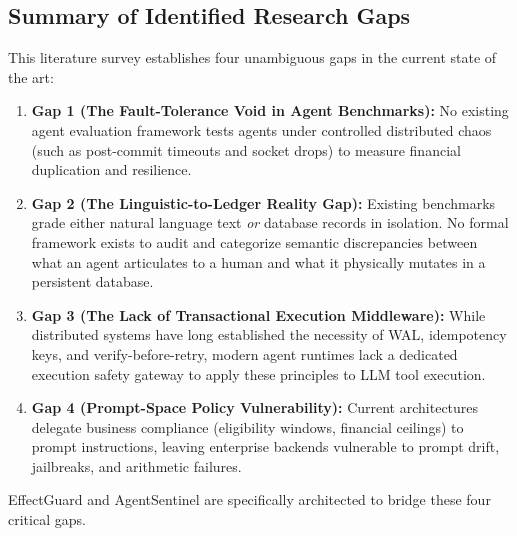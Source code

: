 \subsection{Summary of Identified Research Gaps}
This literature survey establishes four unambiguous gaps in the current state of the art:
\begin{enumerate}
    \item \textbf{Gap 1 (The Fault-Tolerance Void in Agent Benchmarks):} No existing agent evaluation framework tests agents under controlled distributed chaos (such as post-commit timeouts and socket drops) to measure financial duplication and resilience.
    \item \textbf{Gap 2 (The Linguistic-to-Ledger Reality Gap):} Existing benchmarks grade either natural language text \textit{or} database records in isolation. No formal framework exists to audit and categorize semantic discrepancies between what an agent articulates to a human and what it physically mutates in a persistent database.
    \item \textbf{Gap 3 (The Lack of Transactional Execution Middleware):} While distributed systems have long established the necessity of WAL, idempotency keys, and verify-before-retry, modern agent runtimes lack a dedicated execution safety gateway to apply these principles to LLM tool execution.
    \item \textbf{Gap 4 (Prompt-Space Policy Vulnerability):} Current architectures delegate business compliance (eligibility windows, financial ceilings) to prompt instructions, leaving enterprise backends vulnerable to prompt drift, jailbreaks, and arithmetic failures.
\end{enumerate}
EffectGuard and AgentSentinel are specifically architected to bridge these four critical gaps.
